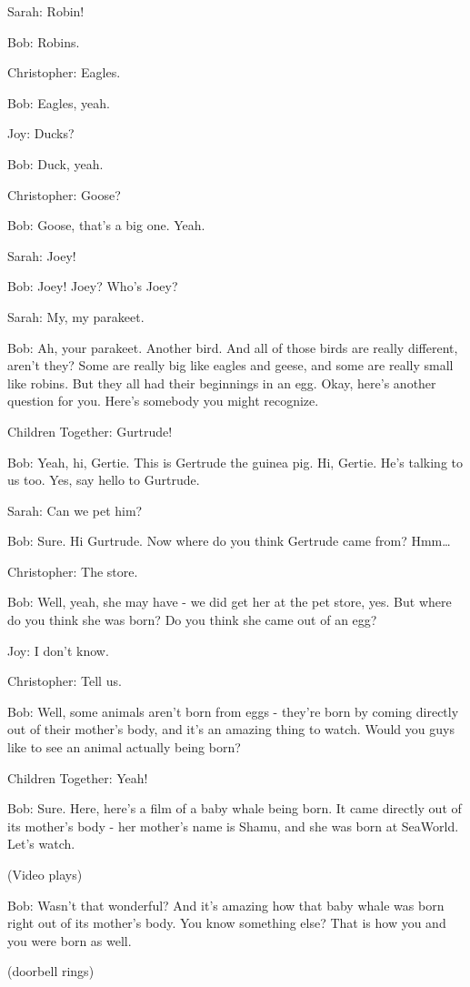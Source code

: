 Sarah: Robin!

Bob: Robins.

Christopher: Eagles.

Bob: Eagles, yeah.

Joy: Ducks?

Bob: Duck, yeah.

Christopher: Goose?

Bob: Goose, that's a big one. Yeah.

Sarah: Joey!

Bob: Joey! Joey? Who's Joey?

Sarah: My, my parakeet.

Bob: Ah, your parakeet. Another bird. And all of those birds are really different, aren't they? Some are really big like eagles and geese, and some are really small like robins. But they all had their beginnings in an egg. Okay, here's another question for you. Here's somebody you might recognize.

Children Together: Gurtrude!

Bob: Yeah, hi, Gertie. This is Gertrude the guinea pig. Hi, Gertie. He's talking to us too. Yes, say hello to Gurtrude.

Sarah: Can we pet him?

Bob: Sure. Hi Gurtrude. Now where do you think Gertrude came from? Hmm\dots

Christopher: The store.

Bob: Well, yeah, she may have - we did get her at the pet store, yes. But where do you think she was born? Do you think she came out of an egg?

Joy: I don't know.

Christopher: Tell us.

Bob: Well, some animals aren't born from eggs - they're born by coming directly out of their mother's body, and it's an amazing thing to watch. Would you guys like to see an animal actually being born?

Children Together: Yeah!

Bob: Sure. Here, here's a film of a baby whale being born. It came directly out of its mother's body - her mother's name is Shamu, and she was born at SeaWorld. Let's watch.

(Video plays)

Bob: Wasn't that wonderful? And it's amazing how that baby whale was born right out of its mother's body. You know something else? That is how you and you were born as well.

(doorbell rings)

